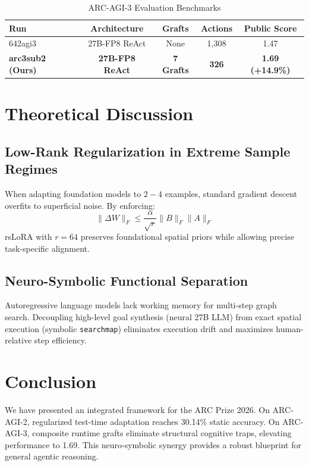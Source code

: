 \documentclass[10pt,journal,compsoc]{IEEEtran}
\begin{document}
\begin{table}[ht]
\centering
\caption{ARC-AGI-3 Evaluation Benchmarks}
\label{tab:arc3}
\begin{tabular}{lcccc}
\toprule
Run & Architecture & Grafts & Actions & Public Score \\
\midrule
642agi3 & 27B-FP8 ReAct & None & 1,308 & 1.47 \\
\textbf{arc3sub2 (Ours)} & \textbf{27B-FP8 ReAct} & \textbf{7 Grafts} & \textbf{326} & \textbf{1.69 (+14.9\%)} \\
\bottomrule
\end{tabular}
\end{table}

\section{Theoretical Discussion}
\subsection{Low-Rank Regularization in Extreme Sample Regimes}
When adapting foundation models to $2-4$ examples, standard gradient descent overfits to superficial noise. By enforcing:
\begin{equation}
    \|\Delta W\|_F \le \frac{\alpha}{\sqrt{r}} \|B\|_F \|A\|_F
\end{equation}
rsLoRA with $r=64$ preserves foundational spatial priors while allowing precise task-specific alignment.

\subsection{Neuro-Symbolic Functional Separation}
Autoregressive language models lack working memory for multi-step graph search. Decoupling high-level goal synthesis (neural 27B LLM) from exact spatial execution (symbolic \texttt{searchmap}) eliminates execution drift and maximizes human-relative step efficiency.

\section{Conclusion}
We have presented an integrated framework for the ARC Prize 2026. On ARC-AGI-2, regularized test-time adaptation reaches 30.14\% static accuracy. On ARC-AGI-3, composite runtime grafts eliminate structural cognitive traps, elevating performance to 1.69. This neuro-symbolic synergy provides a robust blueprint for general agentic reasoning.



\end{document}
